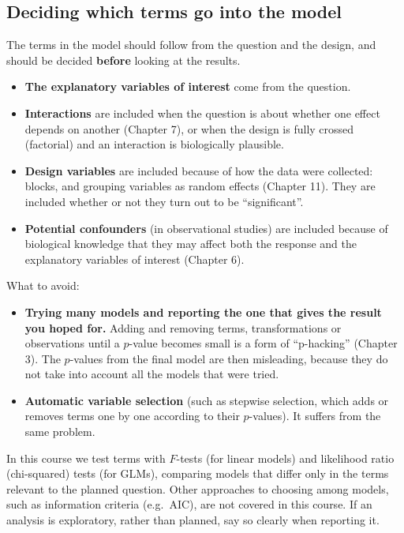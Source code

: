 \documentclass[
  letterpaper,
  8pt,
  a4paper]{book}
\providecommand{\tightlist}{%
  \setlength{\itemsep}{0pt}\setlength{\parskip}{0pt}}
\begin{document}
\subsection*{Deciding which terms go into the
model}\label{deciding-which-terms-go-into-the-model}

The terms in the model should follow from the question and the design,
and should be decided \textbf{before} looking at the results.

\begin{itemize}
\tightlist
\item
  \textbf{The explanatory variables of interest} come from the question.
\item
  \textbf{Interactions} are included when the question is about whether
  one effect depends on another (Chapter 7), or when the design is fully
  crossed (factorial) and an interaction is biologically plausible.
\item
  \textbf{Design variables} are included because of how the data were
  collected: blocks, and grouping variables as random effects (Chapter
  11). They are included whether or not they turn out to be
  ``significant''.
\item
  \textbf{Potential confounders} (in observational studies) are included
  because of biological knowledge that they may affect both the response
  and the explanatory variables of interest (Chapter 6).
\end{itemize}

What to avoid:

\begin{itemize}
\tightlist
\item
  \textbf{Trying many models and reporting the one that gives the result
  you hoped for.} Adding and removing terms, transformations or
  observations until a \(p\)-value becomes small is a form of
  ``p-hacking'' (Chapter 3). The \(p\)-values from the final model are
  then misleading, because they do not take into account all the models
  that were tried.
\item
  \textbf{Automatic variable selection} (such as stepwise selection,
  which adds or removes terms one by one according to their
  \(p\)-values). It suffers from the same problem.
\end{itemize}

In this course we test terms with \(F\)-tests (for linear models) and
likelihood ratio (chi-squared) tests (for GLMs), comparing models that
differ only in the terms relevant to the planned question. Other
approaches to choosing among models, such as information criteria
(e.g.~AIC), are not covered in this course. If an analysis is
exploratory, rather than planned, say so clearly when reporting it.
\end{document}
